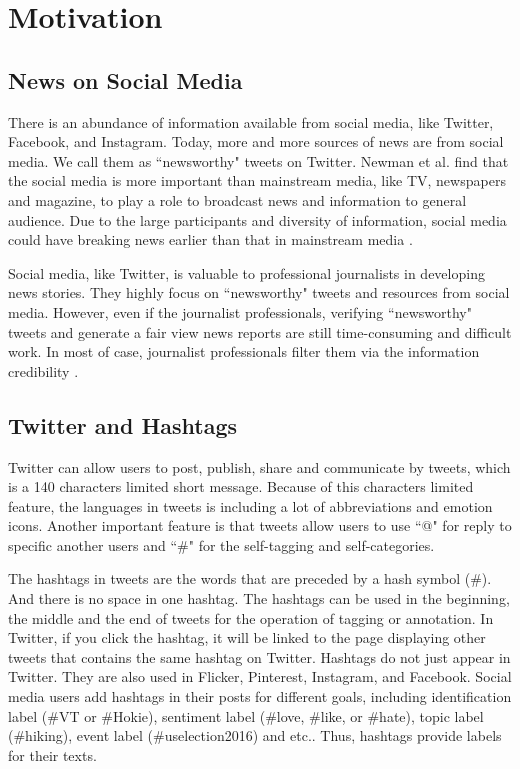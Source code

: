 
\section{Motivation}

\subsection{News on Social Media}

There is an abundance of information available from social media, like Twitter, Facebook, and Instagram. Today, more and more sources of news are from social media. We call them as ``newsworthy" tweets on Twitter. Newman et al. \cite{Newman2011} find that the social media is more important than mainstream media, like TV, newspapers and magazine, to play a role to broadcast news and information to general audience. Due to the large participants and diversity of information, social media could have breaking news earlier than that in mainstream media \cite{Kwak2010}. 

Social media, like Twitter, is valuable to professional journalists in developing news stories. They highly focus on ``newsworthy" tweets and resources from social media. However, even if the journalist professionals, verifying ``newsworthy" tweets and generate a fair view news reports are still time-consuming and difficult work. In most of case, journalist professionals filter them via the information credibility \cite{Silverman2014}. 

\subsection{Twitter and Hashtags}

Twitter can allow users to post, publish, share and communicate by tweets, which is a 140 characters limited short message. Because of this characters limited feature, the languages in tweets is including a lot of abbreviations and emotion icons. Another important feature is that tweets allow users to use ``@" for reply to specific another users and ``\#" for the self-tagging and self-categories. 

The hashtags in tweets are the words that are preceded by a hash symbol (\#). And there is no space in one hashtag. The hashtags can be used in the beginning, the middle and the end of tweets for the operation of tagging or annotation. In Twitter, if you click the hashtag, it will be linked to the page displaying other tweets that contains the same hashtag on Twitter. Hashtags do not just appear in Twitter. They are also used in Flicker, Pinterest, Instagram, and Facebook. Social media users add hashtags in their posts for different goals, including identification label (\#VT or \#Hokie), sentiment label (\#love, \#like, or \#hate), topic label (\#hiking), event label (\#uselection2016) and etc.. Thus, hashtags provide labels for their texts.


